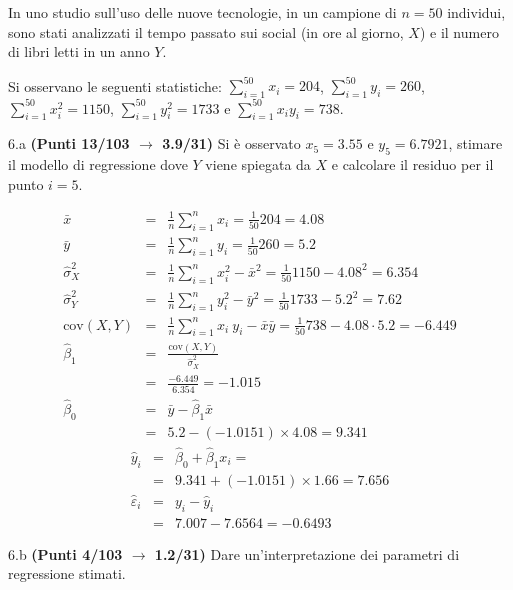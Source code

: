 \documentclass[
  11pt,
]{book}
\theoremstyle{mytheoremstyle}
\theoremstyle{mydefstyle}
\newenvironment{sol}
  {
  \begin{tcolorbox}[enhanced,breakable,arc=0.1mm,boxrule=1pt,colback=white,colframe=iblue,
  title=\bf \fontfamily{lmss}\selectfont \hspace{.5 cm} Soluzione,drop fuzzy shadow]

}{
\end{tcolorbox}
  }
\begin{document}
In uno studio sull'uso delle nuove tecnologie, in un campione di \(n=50\) individui, sono stati analizzati il tempo passato sui social (in ore al giorno, \(X\)) e il numero di libri letti in un anno \(Y\).

Si osservano le seguenti statistiche:
\(\sum_{i=1}^{50}x_i=204\), \(\sum_{i=1}^{50}y_i=260\),
\(\sum_{i=1}^{50}x_i^2=1150\), \(\sum_{i=1}^{50}y_i^2=1733\) e \(\sum_{i=1}^{50}x_iy_i=738\).

6.a \textbf{(Punti 13/103 \(\rightarrow\) 3.9/31)} Si è osservato \(x_5=3.55\) e \(y_5=6.7921\), stimare il modello di regressione dove \(Y\) viene spiegata da \(X\) e calcolare il residuo per il punto \(i=5\).

\begin{sol}
\begin{eqnarray*}
           \bar x &=&\frac 1 n\sum_{i=1}^n x_i = \frac {1}{ 50 }  204 =  4.08 \\
           \bar y &=&\frac 1 n\sum_{i=1}^n y_i = \frac {1}{ 50 }  260 =  5.2 \\
           \hat\sigma_X^2&=&\frac 1 n\sum_{i=1}^n x_i^2-\bar x^2=\frac {1}{ 50 }  1150  - 4.08 ^2= 6.354 \\
           \hat\sigma_Y^2&=&\frac 1 n\sum_{i=1}^n y_i^2-\bar y^2=\frac {1}{ 50 }  1733  - 5.2 ^2= 7.62 \\
           \text{cov}(X,Y)&=&\frac 1 n\sum_{i=1}^n x_i~y_i-\bar x\bar y=\frac {1}{ 50 }  738 - 4.08 \cdot 5.2 = -6.449 \\
           \hat\beta_1 &=& \frac{\text{cov}(X,Y)}{\hat\sigma_X^2} \\
                    &=& \frac{ -6.449 }{ 6.354 }  =  -1.015 \\
           \hat\beta_0 &=& \bar y - \hat\beta_1 \bar x\\
                    &=&  5.2 - (-1.0151) \times  4.08 = 9.341 
         \end{eqnarray*}\begin{eqnarray*}
\hat y_i &=&\hat\beta_0+\hat\beta_1 x_i=\\ 
&=& 9.341 + (-1.0151) \times 1.66 = 7.656 \\ 
\hat \varepsilon_i &=& y_i-\hat y_i\\ 
&=& 7.007 - 7.6564 = -0.6493  
\end{eqnarray*}

\end{sol}

6.b \textbf{(Punti 4/103 \(\rightarrow\) 1.2/31)} Dare un'interpretazione dei parametri di regressione stimati.
\end{document}

